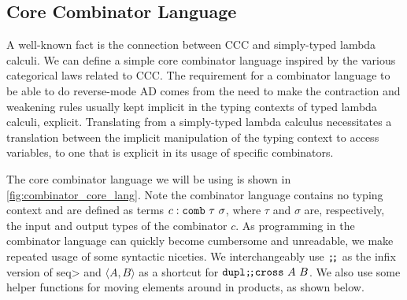 \subsection{Core Combinator Language}\label{sec:combinator-core}
  A well-known fact is the connection between CCC and simply-typed lambda calculi\cite{10.1007/3-540-15198-2_10}.
  We can define a simple core combinator language inspired by the various categorical laws related to CCC.
  The requirement for a combinator language to be able to do reverse-mode AD comes from the need to make the contraction and weakening rules usually kept implicit in the typing contexts of typed lambda calculi, explicit.
  Translating from a simply-typed lambda calculus necessitates a translation between the implicit manipulation of the typing context to access variables, to one that is explicit in its usage of specific combinators.

  The core combinator language we will be using is shown in \cref{fig:combinator_core_lang}.
  Note the combinator language contains no typing context and are defined as terms $c : \texttt{comb}\ \tau\ \sigma$, where $\tau$ and $\sigma$ are, respectively, the input and output types of the combinator $c$.
  As programming in the combinator language can quickly become cumbersome and unreadable, we make repeated usage of some syntactic niceties.
  We interchangeably use $\texttt{;\!;}$ as the infix version of \<seq> and $\langle A, B\rangle$ as a shortcut for $\texttt{dupl} \texttt{;\!;} \texttt{cross}\ A\ B$.
  We also use some helper functions for moving elements around in products, as shown below.

